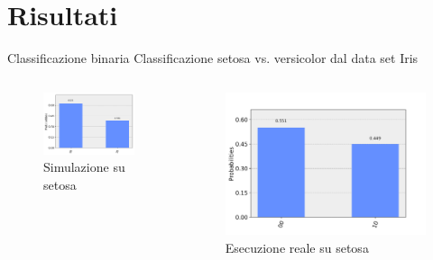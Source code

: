 \documentclass{beamer}
\begin{document}
    \section{Risultati}

    \begin{frame}{Classificazione binaria}
        Classificazione setosa vs. versicolor dal data set Iris
        \begin{columns}
            \begin{figure}[h]
                \centering
                \includegraphics[width=\textwidth]{gfx/iris/iris2SetosaVersicolorResult.png}
                \caption{Simulazione su setosa}
                \label{fig:simulazione.setosa}
            \end{figure}
            \begin{figure}[h]
                \centering
                \includegraphics[width=\textwidth]{gfx/misura_setosa_sperimentale.png}
                \caption{Esecuzione reale su setosa}
                \label{fig:esecuzione.setosa}
            \end{figure}
        \end{columns}
    \end{frame}
\end{document}
